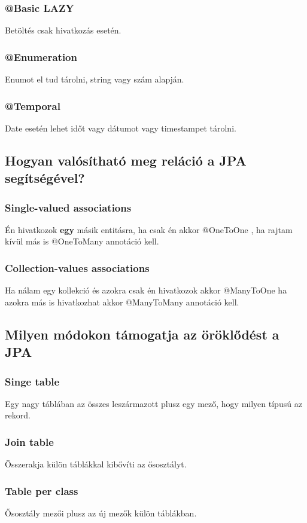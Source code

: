 \documentclass[a4paper,14pt]{extarticle}
\begin{document}
			\subsubsection{@Basic LAZY} Betöltés csak hivatkozás esetén.
			\subsubsection{@Enumeration} Enumot el tud tárolni, string vagy szám alapján.
			\subsubsection{@Temporal} Date esetén lehet időt vagy dátumot vagy timestampet tárolni.
		\subsection{Hogyan valósítható meg reláció a JPA segítségével?}
		\subsubsection{Single-valued associations}
		Én hivatkozok \textbf{egy} másik entitásra, ha csak én akkor @OneToOne , ha rajtam kívül más is @OneToMany annotáció kell.
		\subsubsection{Collection-values associations}
		Ha nálam egy kollekció és azokra csak én hivatkozok akkor @ManyToOne ha azokra más is hivatkozhat akkor @ManyToMany annotáció kell.
		\subsection{Milyen módokon támogatja az öröklődést a JPA}
			\subsubsection{Singe table} Egy nagy táblában az összes leszármazott plusz egy mező, hogy milyen típusú az rekord.
			\subsubsection{Join table} Összerakja külön táblákkal kibővíti az ősosztályt.
			\subsubsection{Table per class}
			Ősosztály mezői plusz az új mezők külön táblákban.
			
\end{document}
